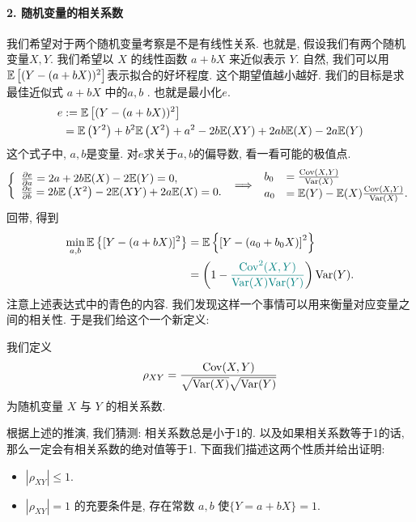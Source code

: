 \paragraph{2. 随机变量的相关系数} 我们希望对于两个随机变量考察是不是有线性关系. 也就是, 假设我们有两个随机变量$X,Y$. 我们希望以 $X$ 的线性函数 $a+b X$ 来近似表示 $Y$. 自然, 我们可以用$\mathbb E\left[(Y-(a+b X))^2\right]$表示拟合的好坏程度. 这个期望值越小越好. 我们的目标是求最佳近似式 $a+b X$ 中的$a,b$ .
也就是最小化$e$.
 $$
\begin{aligned}
e & :=\mathbb E\left[(Y-(a+b X))^2\right] \\
& =\mathbb E\left(Y^2\right)+b^2 \mathbb E\left(X^2\right)+a^2-2 b \mathbb E(X Y)+2 a b \mathbb E(X)-2 a \mathbb E(Y)
\end{aligned}
$$
这个式子中, $a,b$是变量. 对$e$求关于$a,b $的偏导数, 看一看可能的极值点.
$$
\left\{\begin{array}{l}
\frac{\partial e}{\partial a}=2 a+2 b \mathbb E(X)-2 \mathbb E(Y)=0, \\
\frac{\partial e}{\partial b}=2 b \mathbb E\left(X^2\right)-2 \mathbb E(X Y)+2 a \mathbb E(X)=0 .
\end{array}\right. \implies \begin{array}{ll}
b_0 & =\frac{\operatorname{Cov}(X, Y)}{\operatorname{Var}(X)} \\
a_0 & =\mathbb E(Y)-\mathbb E(X) \frac{\operatorname{Cov}(X, Y)}{\operatorname{Var}(X)} .
\end{array}
$$
回带, 得到
$$
\begin{aligned}
\min _{a, b} \mathbb E\left\{[Y-(a+b X)]^2\right\} & =\mathbb E\left\{\left[Y-\left(a_0+b_0 X\right)\right]^2\right\} \\
& =\left(1-{{\color{teal}\frac{\operatorname{Cov}^2(X, Y)}{{\operatorname{Var}(X)} {\operatorname{Var}(Y)}}}}\right) \operatorname{Var}(Y)  .
\end{aligned}
$$
注意上述表达式中的青色的内容. 我们发现这样一个事情可以用来衡量对应变量之间的相关性. 于是我们给这个一个新定义: 

\begin{definition}
    我们定义
    $$
    \rho_{X Y}=\frac{\operatorname{Cov}(X, Y)}{\sqrt{\operatorname{Var}(X)} \sqrt{\operatorname{Var}(Y)}}
    $$
    为随机变量 $X$ 与 $Y$ 的相关系数.
\end{definition}

根据上述的推演, 我们猜测: 相关系数总是小于1的. 以及如果相关系数等于1的话, 那么一定会有相关系数的绝对值等于1. 下面我们描述这两个性质并给出证明: 

\begin{itemize}
    \item $\left|\rho_{X Y}\right| \leq 1$.
    \item $\left|\rho_{X Y}\right|=1$ 的充要条件是, 存在常数 $a, b$ 使$\{Y=a+b X\}=1$.
\end{itemize}


